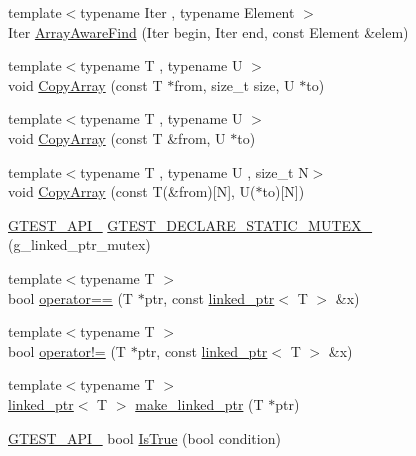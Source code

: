 \begin{DoxyCompactItemize}
\item 
{\footnotesize template$<$typename Iter , typename Element $>$ }\\Iter \hyperlink{namespacetesting_1_1internal_a94a857fe6ff32cf4fdc4769a4071f239}{Array\+Aware\+Find} (Iter begin, Iter end, const Element \&elem)
\item 
{\footnotesize template$<$typename T , typename U $>$ }\\void \hyperlink{namespacetesting_1_1internal_afb1b9728aaaf6d9fe6246a19cfe3f7f5}{Copy\+Array} (const T $\ast$from, size\+\_\+t size, U $\ast$to)
\item 
{\footnotesize template$<$typename T , typename U $>$ }\\void \hyperlink{namespacetesting_1_1internal_a84d0e746ba0827cc52b53d22000de0e8}{Copy\+Array} (const T \&from, U $\ast$to)
\item 
{\footnotesize template$<$typename T , typename U , size\+\_\+t N$>$ }\\void \hyperlink{namespacetesting_1_1internal_a1e7ae855686720615dcd5754c8181c62}{Copy\+Array} (const T(\&from)\mbox{[}N\mbox{]}, U($\ast$to)\mbox{[}N\mbox{]})
\item 
\hyperlink{gtest-port_8h_aa73be6f0ba4a7456180a94904ce17790}{G\+T\+E\+S\+T\+\_\+\+A\+P\+I\+\_\+} \hyperlink{namespacetesting_1_1internal_ad7c5625384cf5f6b714188f274537ef6}{G\+T\+E\+S\+T\+\_\+\+D\+E\+C\+L\+A\+R\+E\+\_\+\+S\+T\+A\+T\+I\+C\+\_\+\+M\+U\+T\+E\+X\+\_\+} (g\+\_\+linked\+\_\+ptr\+\_\+mutex)
\item 
{\footnotesize template$<$typename T $>$ }\\bool \hyperlink{namespacetesting_1_1internal_ad1cb54a206a209ddace17a05359d38ae}{operator==} (T $\ast$ptr, const \hyperlink{classtesting_1_1internal_1_1linked__ptr}{linked\+\_\+ptr}$<$ T $>$ \&x)
\item 
{\footnotesize template$<$typename T $>$ }\\bool \hyperlink{namespacetesting_1_1internal_a6910869259f8f31825b471e9190fa09a}{operator!=} (T $\ast$ptr, const \hyperlink{classtesting_1_1internal_1_1linked__ptr}{linked\+\_\+ptr}$<$ T $>$ \&x)
\item 
{\footnotesize template$<$typename T $>$ }\\\hyperlink{classtesting_1_1internal_1_1linked__ptr}{linked\+\_\+ptr}$<$ T $>$ \hyperlink{namespacetesting_1_1internal_a0d79fad1f772844eff35dfe955f24fd6}{make\+\_\+linked\+\_\+ptr} (T $\ast$ptr)
\item 
\hyperlink{gtest-port_8h_aa73be6f0ba4a7456180a94904ce17790}{G\+T\+E\+S\+T\+\_\+\+A\+P\+I\+\_\+} bool \hyperlink{namespacetesting_1_1internal_a527b9bcc13669b9a16400c8514266254}{Is\+True} (bool condition)

\end{DoxyCompactItemize}
